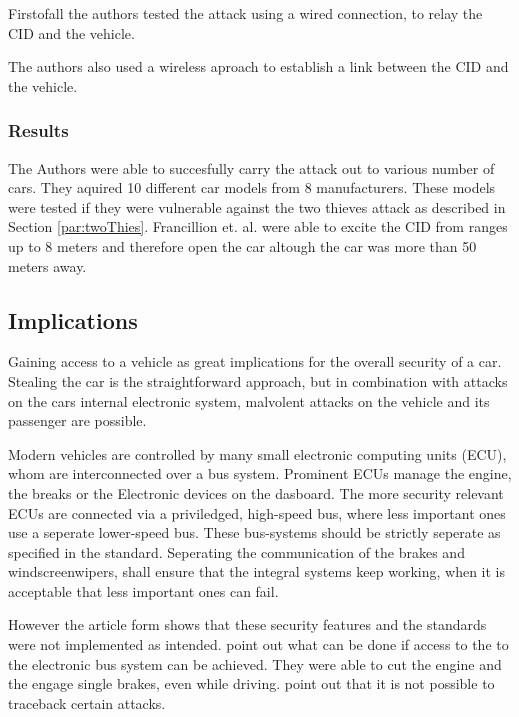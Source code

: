 Firstofall the authors tested the attack using a wired connection,
to relay the CID and the vehicle.

The authors also used a wireless aproach to establish a link between the CID and the vehicle.

\subsubsection*{Results}
The Authors were able to succesfully carry the attack out to various number of cars.
They aquired 10 different car models from 8 manufacturers.
These models were tested if they were vulnerable against the two thieves attack as described in 
Section \ref{par:twoThies}.
Francillion et. al. %
were able to excite the CID from ranges up to 8 meters
and therefore open the car altough the car was more than 50 meters away.

\subsection*{Implications}
\label{sec:attackImplications}
Gaining access to a vehicle as great implications for the overall security of a car.
Stealing the car is the straightforward approach,
but in combination with attacks on the cars internal electronic system,
malvolent attacks on the vehicle and its passenger are possible.

Modern vehicles are controlled by many small electronic computing units (ECU),
whom are interconnected over a bus system.
Prominent ECUs manage the engine, the breaks or the Electronic devices on the dasboard.
The more security relevant ECUs are connected via a priviledged,
high-speed bus,
where less important ones use a seperate lower-speed bus.
These bus-systems should be strictly seperate as specified in the standard. %
Seperating the communication of the brakes and windscreenwipers,
shall ensure that the integral systems keep working,
when it is acceptable that less important ones can fail.

However the article form \cite{expModernAuto} %
shows that these security features and the standards were not implemented as intended.
point out what can be done if access to the to the electronic bus system can be achieved.
They were able to cut the engine and the engage single brakes,
even while driving.
point out that it is not possible to traceback certain attacks.	%

